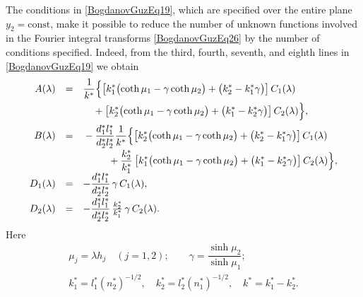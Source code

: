The conditions in \eqref{BogdanovGuzEq19}, which are specified over the entire plane $y_{2}=\mathrm{const}$, make it possible to reduce the number of unknown functions involved in the Fourier integral transforms \eqref{BogdanovGuzEq26} by the number of conditions specified. Indeed, from the third, fourth, seventh, and eighth lines in \eqref{BogdanovGuzEq19} we obtain
\begin{equation}
	\label{BogdanovGuzEq28}
	\begin{array}{rcl}
		A(\lambda)
		&=&
		\begin{multlined}[t]
			\displaystyle
			\frac{1}{k^{*}}
			\Bigl\{
			\left[
			k_{1}^{*}\bigl(\coth\mu_{1}-\gamma\coth\mu_{2}\bigr)
			+\bigl(k_{2}^{*}-k_{1}^{*}\gamma\bigr)
			\right]C_{1}(\lambda)
			\\[-1em]
			+
			\left[
			k_{2}^{*}\bigl(\coth\mu_{1}-\gamma\coth\mu_{2}\bigr)
			+\bigl(k_{1}^{*}-k_{2}^{*}\gamma\bigr)
			\right]C_{2}(\lambda)
			\Bigr\},
		\end{multlined}
		\\[3em]
		B(\lambda)
		&=&
		\begin{multlined}[t]
			\displaystyle
			-\frac{d_{1}^{*}l_{1}^{*}}{d_{2}^{*}l_{2}^{*}}
			\frac{1}{k^{*}}
			\Bigl\{
			\left[
			k_{2}^{*}\bigl(\coth\mu_{1}-\gamma\coth\mu_{2}\bigr)
			+\bigl(k_{2}^{*}-k_{1}^{*}\gamma\bigr)
			\right]C_{1}(\lambda)
			\\[-1.2em]
			+
			\frac{k_{2}^{*}}{k_{1}^{*}}
			\left[
			k_{1}^{*}\bigl(\coth\mu_{1}-\gamma\coth\mu_{2}\bigr)
			+\bigl(k_{1}^{*}-k_{2}^{*}\gamma\bigr)
			\right]C_{2}(\lambda)
			\Bigr\},
		\end{multlined}
		\\
		D_{1}(\lambda)
		&=&
		-\dfrac{d_{1}^{*}l_{1}^{*}}{d_{2}^{*}l_{2}^{*}}\,
		\gamma\,C_{1}(\lambda),
		\\[8pt]
		D_{2}(\lambda)
		&=&
		-\dfrac{d_{1}^{*}l_{1}^{*}}{d_{2}^{*}l_{2}^{*}}\,
		\frac{k_{2}^{*}}{k_{1}^{*}}\,
		\gamma\,C_{2}(\lambda).
	\end{array}
\end{equation}
%
Here
\begin{equation}
	\label{BogdanovGuzEq29}
	\begin{array}{l}
		\mu_{j}=\lambda h_{j} \quad (j=1,2); \qquad
		\gamma=\dfrac{\sinh\mu_{2}}{\sinh\mu_{1}}; 
		\\[8pt]
		k_{1}^{*}=l_{1}^{*}(n_{2}^{*})^{-1/2}, \quad
		k_{2}^{*}=l_{2}^{*}(n_{1}^{*})^{-1/2}, \quad
		k^{*}=k_{1}^{*}-k_{2}^{*}.
	\end{array}
\end{equation}

